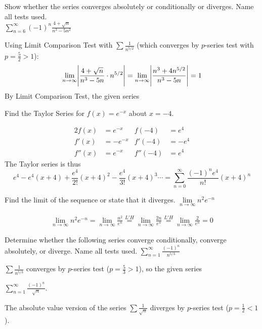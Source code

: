 \documentclass[12pt,answers]{exam}
\begin{document}
\begin{questions}
\question[10]
Show whether the series converges absolutely or conditionally or diverges.
Name all tests used.
\\
$\displaystyle \sum_{n=6}^\infty (-1)^n \frac{4+\sqrt n}{n^3-5n^2}$
\begin{solution}
  Using Limit Comparison Test with $\sum \frac{1}{n^{5/2}}$ (which converges by $p$-series test with $p = \frac52 > 1$):
  \[
    \lim_{n\to\infty} \abs{\frac{4+\sqrt{n}}{n^3-5n} \cdot n^{5/2}}
    = \lim_{n\to\infty} \abs{\frac{n^3+4n^{5/2}}{n^3-5n}} = 1
  \]
  By Limit Comparison Test, the given series 
\end{solution}

\newpage
\question[10]
Find the Taylor Series for $f(x) = e^{-x}$ about $x = -4$.
\begin{solution}
  \begin{alignat*}{2}
    f(x)   & = e^{-x}  & f(-4)   & = e^4    \\
    f'(x)  & = -e^{-x} & f'(-4)  & = -e^{4} \\
    f''(x) & = e^{-x}  & f''(-4) & = e^{4}
  \end{alignat*}
  The Taylor series is thus
  \[
    e^4 -e^4(x+4) + \frac{e^4}{2!} (x+4)^2 - \frac{e^4}{3!} (x+4)^3 \cdots
    = \boxed{\sum_{n=0}^\infty \frac{(-1)^n e^4}{n!} (x+4)^n}
  \]
\end{solution}

\question[10]
Find the limit of the sequence or state that it diverges.
$\lim\limits_{n\to\infty} n^2e^{-n}$
\begin{solution}
  \begin{align*}
    \lim\limits_{n\to\infty} n^2e^{-n}
    = \lim_{n\to\infty} \frac{n^2}{e^n}
    \overset{L'H}{=}
    \lim_{n\to\infty} \frac{2n}{e^n}
    \overset{L'H}{=}
    \lim_{n\to\infty} \frac{2}{e^n}
    = \boxed{0}
  \end{align*}
\end{solution}

\newpage
Determine whether the following series converge conditionally, converge absolutely, or diverge. Name all tests used.
\question[10]
$\displaystyle \sum_{n=1}^\infty \frac{(-1)^n}{n^{5/3}}$
\begin{solution}
  $\displaystyle \sum \frac{1}{n^{5/3}}$ converges by $p$-series test ($p = \frac53 > 1$), so the given series 
\end{solution}

\question[10]
$\displaystyle\sum_{n=1}^\infty \frac{(-1)^n}{\sqrt{n}}$.
\begin{solution}
  The absolute value version of the series
  $\displaystyle \sum \frac{1}{\sqrt n}$ diverges by $p$-series test ($p = \frac12 < 1$).


\end{solution}
\end{questions}
\end{document}

